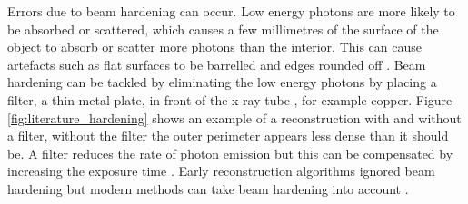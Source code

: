 Errors due to beam hardening can occur. Low energy photons are more likely to be absorbed or scattered, which causes a few millimetres of the surface of the object to absorb or scatter more photons than the interior. This can cause artefacts \citep{sun2016applications} such as flat surfaces to be barrelled and edges rounded off \citep{kruth2011computed}. Beam hardening can be tackled by eliminating the low energy photons by placing a filter, a thin metal plate, in front of the x-ray tube \citep{welkenhuyzen2009industrial}, for example copper. Figure \ref{fig:literature_hardening} shows an example of a reconstruction with and without a filter, without the filter the outer perimeter appears less dense than it should be.  A filter reduces the rate of photon emission but this can be compensated by increasing the exposure time \citep{kruth2011computed}. Early reconstruction algorithms ignored beam hardening but modern methods can take beam hardening into account \citep{elbakri2001statistical, sun2016applications}.

